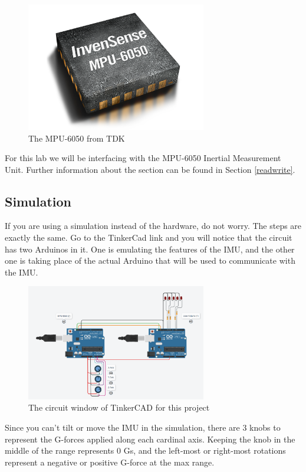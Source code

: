\documentclass{article}
\begin{document}
        \begin{figure}[ht]
            \centering
            \includegraphics[width = 0.7\textwidth]{img/rp-mpu-6050.png}
            \caption{The MPU-6050 from TDK}
        \end{figure}
        For this lab we will be interfacing with the MPU-6050 Inertial Measurement Unit. Further information about the section can be found in Section \ref{readwrite}.
        
    \subsection{Simulation}
        If you are using a simulation instead of the hardware, do not worry.  The steps are exactly the same.  Go to the TinkerCad link and you will notice that the circuit has two Arduinos in it.  One is emulating the features of the IMU, and the other one is taking place of the actual Arduino that will be used to communicate with the IMU.
        
        \begin{figure}[ht]
            \centering
            \includegraphics[width = 0.7\textwidth]{img/TinkerCadWires.PNG}
            \caption{The circuit window of TinkerCAD for this project}
        \end{figure}
        Since you can't tilt or move the IMU in the simulation, there are 3 knobs to represent the G-forces applied along each cardinal axis. Keeping the knob in the middle of the range represents 0 Gs, and the left-most or right-most rotations represent a negative or positive G-force at the max range. 
        
\end{document}

